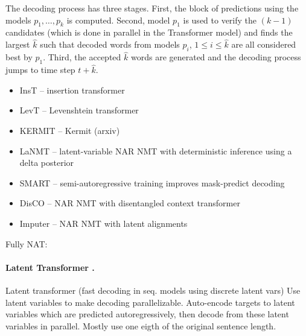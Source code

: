 The decoding process has three stages. First, the block of predictions using the
models $p_1, \ldots, p_k$ is computed. Second, model $p_1$ is used to verify the
$(k-1)$ candidates (which is done in parallel in the Transformer model) and
finds the largest $\hat{k}$ such that decoded words from models $p_i$,
$1 \leq i \leq \hat{k}$ are all considered best by $p_1$. Third, the accepted
$\hat{k}$ words are generated and the decoding process jumps to time step
$t + \hat{k}$.








\begin{itemize}
\item InsT \citep{stern2019insertion} -- insertion transformer
\item LevT \citep{gu2019levenshtein} -- Levenshtein transformer
\item KERMIT \citep{chan2019kermit} -- Kermit (arxiv)
\item LaNMT \citep{shu2020latent} -- latent-variable NAR NMT with deterministic inference using a delta posterior
\item SMART \citep{ghazvininejad2020semiautoregressive} -- semi-autoregressive training improves mask-predict decoding
\item DisCO \citep{kasai2020nonautoregressive} -- NAR NMT with disentangled context transformer
\item Imputer \citep{saharia2020nonautoregressive} -- NAR NMT with latent alignments
\end{itemize}

Fully NAT:



\paragraph{Latent Transformer \citep{kaiser2018fast}.} Latent transformer (fast
decoding in seq. models using discrete latent vars) Use latent variables to make
decoding parallelizable. Auto-encode targets to latent variables which are
predicted autoregressively, then decode from these latent variables in
parallel. Mostly use one eigth of the original sentence length.

